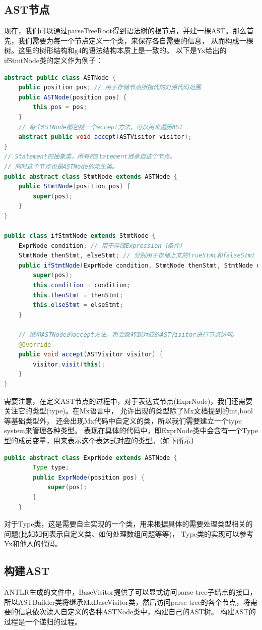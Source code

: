 \subsection{AST节点}
现在，我们可以通过parseTreeRoot得到语法树的根节点，并建一棵AST。那么首先，我们需要为每一个节点定义一个类，来保存各自需要的信息，
从而构成一棵树。这里的树形结构和g4的语法结构本质上是一致的。
以下是Yx给出的ifStmtNode类的定义作为例子：
\begin{lstlisting}[language=Java]
abstract public class ASTNode {
    public position pos; // 用于存储节点所指代的对源代码范围
    public ASTNode(position pos) {
        this.pos = pos;
    }
    // 每个ASTNode都包括一个accept方法，可以用来遍历AST
    abstract public void accept(ASTVisitor visitor);
}
// Statement的抽象类，所有的Statement继承自这个节点。
// 同时这个节点也是ASTNode的派生类。
public abstract class StmtNode extends ASTNode {
    public StmtNode(position pos) {
        super(pos);
    }
}

public class ifStmtNode extends StmtNode {
    ExprNode condition; // 用于存储Expression（条件）
    StmtNode thenStmt, elseStmt; // 分别用于存储上文的trueStmt和falseStmt
    public ifStmtNode(ExprNode condition, StmtNode thenStmt, StmtNode elseStmt, position pos) {
        super(pos);
        this.condition = condition;
        this.thenStmt = thenStmt;
        this.elseStmt = elseStmt;
    }
    
    // 继承ASTNode的accept方法，将会跳转到对应的ASTVisitor进行节点访问。
    @Override
    public void accept(ASTVisitor visitor) {
        visitor.visit(this);
    }
}
\end{lstlisting}

需要注意，在定义AST节点的过程中，对于表达式节点(ExprNode)，我们还需要关注它的类型(type)。在Mx语言中，
允许出现的类型除了Mx文档提到的int,bool等基础类型外，
还会出现Mx代码中自定义的类，所以我们需要建立一个type system来管理各种类型。
表现在具体的代码中，即ExprNode类中会含有一个Type型的成员变量，用来表示这个表达式对应的类型。（如下所示）
\begin{lstlisting}[language=Java]
    public abstract class ExprNode extends ASTNode {
        Type type;
        public ExprNode(position pos) {
            super(pos);
        }
    }
\end{lstlisting}
对于Type类，这是需要自主实现的一个类，用来根据具体的需要处理类型相关的问题(比如如何表示自定义类、如何处理数组问题等等)，
Type类的实现可以参考Yx和他人的代码。


\subsection{构建AST}
ANTLR生成的文件中，BaseVisitor提供了可以显式访问parse tree子结点的接口，所以ASTBuilder类将继承MxBaseVisitor类，然后访问parse tree的各个节点，将需要的信息依次读入自定义的各种ASTNode类中，构建自己的AST树。
构建AST的过程是一个递归的过程。

